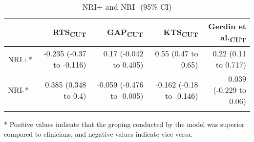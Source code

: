 \begin{table}[!ht]
\centering
\caption{NRI+ and NRI- (95\% CI)} 
\label{table:reclassification}
\begin{adjustbox}{max width = \linewidth} 
\begin{threeparttable} 
\begin{tabular} 
{lrrrr}
   & RTS\textsubscript{CUT} & GAP\textsubscript{CUT} & KTS\textsubscript{CUT} & Gerdin et al.\textsubscript{CUT} \\ 
  \midrule
NRI+* & -0.235 (-0.37 to -0.116) & 0.17 (-0.042 to 0.405) & 0.55 (0.47 to 0.65) & 0.22 (0.11 to 0.717) \\ 
  NRI-* & 0.385 (0.348 to 0.4) & -0.059 (-0.476 to -0.005) & -0.162 (-0.18 to -0.146) & 0.039 (-0.229 to 0.06) \\ 
   \bottomrule
\addlinespace 
\end{tabular} 
\begin{tablenotes} \footnotesize 
\item[*] Positive values indicate that the groping conducted by the model was superior compared to clinicians, and negative values indicate vice versa. 

\end{tablenotes} 
\end{threeparttable} 
\end{adjustbox}
\end{table}


